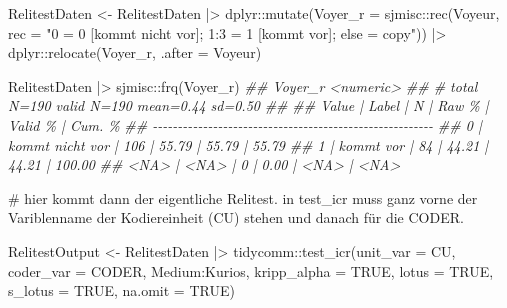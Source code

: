 \documentclass[twoside, pagesize, fontsize=11pt, dvipsnames]{scrreport}
\newenvironment{Shaded}{\begin{snugshade}}{\end{snugshade}}
\newcommand{\AttributeTok}[1]{\textcolor[rgb]{0.40,0.45,0.13}{#1}}
\newcommand{\CommentTok}[1]{\textcolor[rgb]{0.37,0.37,0.37}{#1}}
\newcommand{\ConstantTok}[1]{\textcolor[rgb]{0.56,0.35,0.01}{#1}}
\newcommand{\DocumentationTok}[1]{\textcolor[rgb]{0.37,0.37,0.37}{\textit{#1}}}
\newcommand{\FunctionTok}[1]{\textcolor[rgb]{0.28,0.35,0.67}{#1}}
\newcommand{\NormalTok}[1]{\textcolor[rgb]{0.00,0.23,0.31}{#1}}
\newcommand{\OtherTok}[1]{\textcolor[rgb]{0.00,0.23,0.31}{#1}}
\newcommand{\SpecialCharTok}[1]{\textcolor[rgb]{0.37,0.37,0.37}{#1}}
\newcommand{\StringTok}[1]{\textcolor[rgb]{0.13,0.47,0.30}{#1}}
\begin{document}
\begin{Shaded}
\begin{Highlighting}[]
\NormalTok{RelitestDaten }\OtherTok{\textless{}{-}}\NormalTok{ RelitestDaten }\SpecialCharTok{|\textgreater{}} 
\NormalTok{  dplyr}\SpecialCharTok{::}\FunctionTok{mutate}\NormalTok{(}\AttributeTok{Voyer\_r =}\NormalTok{ sjmisc}\SpecialCharTok{::}\FunctionTok{rec}\NormalTok{(Voyeur, }\AttributeTok{rec =} \StringTok{"0 = 0 [kommt nicht vor]; 1:3 = 1 [kommt vor]; else = copy"}\NormalTok{)) }\SpecialCharTok{|\textgreater{}} 
\NormalTok{  dplyr}\SpecialCharTok{::}\FunctionTok{relocate}\NormalTok{(Voyer\_r, }\AttributeTok{.after =}\NormalTok{ Voyeur)}

\NormalTok{RelitestDaten }\SpecialCharTok{|\textgreater{}} 
\NormalTok{  sjmisc}\SpecialCharTok{::}\FunctionTok{frq}\NormalTok{(Voyer\_r)}
\DocumentationTok{\#\# Voyer\_r \textless{}numeric\textgreater{} }
\DocumentationTok{\#\# \# total N=190 valid N=190 mean=0.44 sd=0.50}
\DocumentationTok{\#\# }
\DocumentationTok{\#\# Value |           Label |   N | Raw \% | Valid \% | Cum. \%}
\DocumentationTok{\#\# {-}{-}{-}{-}{-}{-}{-}{-}{-}{-}{-}{-}{-}{-}{-}{-}{-}{-}{-}{-}{-}{-}{-}{-}{-}{-}{-}{-}{-}{-}{-}{-}{-}{-}{-}{-}{-}{-}{-}{-}{-}{-}{-}{-}{-}{-}{-}{-}{-}{-}{-}{-}{-}{-}{-}{-}}
\DocumentationTok{\#\#     0 | kommt nicht vor | 106 | 55.79 |   55.79 |  55.79}
\DocumentationTok{\#\#     1 |       kommt vor |  84 | 44.21 |   44.21 | 100.00}
\DocumentationTok{\#\#  \textless{}NA\textgreater{} |            \textless{}NA\textgreater{} |   0 |  0.00 |    \textless{}NA\textgreater{} |   \textless{}NA\textgreater{}}

\CommentTok{\# hier kommt dann der eigentliche Relitest. in test\_icr muss ganz vorne der Variblenname der Kodiereinheit (CU) stehen und danach für die CODER. }

\NormalTok{RelitestOutput }\OtherTok{\textless{}{-}}\NormalTok{ RelitestDaten }\SpecialCharTok{|\textgreater{}} 
\NormalTok{  tidycomm}\SpecialCharTok{::}\FunctionTok{test\_icr}\NormalTok{(}\AttributeTok{unit\_var =}\NormalTok{ CU, }\AttributeTok{coder\_var =}\NormalTok{ CODER, Medium}\SpecialCharTok{:}\NormalTok{Kurios, }\AttributeTok{kripp\_alpha =} \ConstantTok{TRUE}\NormalTok{, }\AttributeTok{lotus =} \ConstantTok{TRUE}\NormalTok{, }\AttributeTok{s\_lotus =} \ConstantTok{TRUE}\NormalTok{, }\AttributeTok{na.omit =} \ConstantTok{TRUE}\NormalTok{)}


\end{Highlighting}
\end{Shaded}
\end{document}
